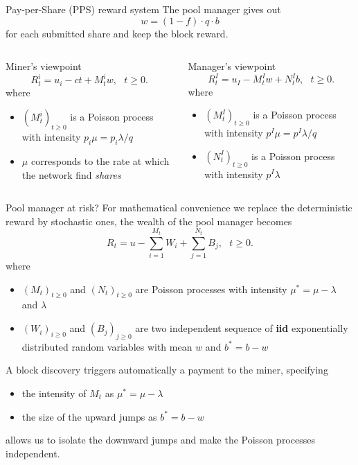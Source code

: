 \documentclass{beamer}
\makeatletter
\newcommand*{\iid}{\textbf{iid}\@\xspace}
\makeatother
\begin{document}
\begin{frame}{Pay-per-Share (PPS) reward system}
\scriptsize
The pool manager gives out
$$
w = (1-f)\cdot q \cdot b 
$$ 
for each submitted share and keep the block reward.
\vspace{1cm}
\begin{columns}
\begin{column}{0.5\textwidth}
Miner's viewpoint
$$
R_t^i = u_i-ct + M_t^i w,\text{ }t\geq0.
$$
where 
\begin{itemize}
   \item $(M_t^i)_{t\geq0}$ is a Poisson process with intensity $p_i \mu= p_i\lambda / q$
   \item $\mu$ corresponds to the rate at which the network find \textit{shares}
\end{itemize}
\end{column}
\begin{column}{0.5\textwidth}
Manager's viewpoint
$$
R_t^I = u_I - M_t^I w+N_t^I b,\text{ }t\geq0.
$$
where 
\begin{itemize}
   \item $(M_t^I)_{t\geq0}$ is a Poisson process with intensity $p^I\mu =p^I\lambda / q$
   \item $(N_t^I)_{t\geq0}$ is a Poisson process with intensity $p^I\lambda$
\end{itemize}
\end{column}
\end{columns}
\end{frame}
\begin{frame}{Pool manager at risk?}
\scriptsize
For mathematical convenience we replace the deterministic reward by stochastic ones, the wealth of the pool manager becomes
$$
R_t= u - \sum_{i=1}^{M_t} W_i +\sum_{j=1}^{N_t} B_j,\text{ }t\geq0.
$$
where 
\begin{itemize}
  \item $(M_t)_{t\geq0}$ and $(N_t)_{t\geq0}$ are Poisson processes with intensity $\mu^\ast=\mu- \lambda$ and $\lambda$
  \item $(W_i)_{i\geq0}$ and $(B_j)_{j\geq0}$ are two independent sequence of \iid exponentially distributed random variables with mean $w$ and $b^\ast = b-w$
\end{itemize}
\begin{tcolorbox}[enhanced,drop shadow, title=Poisson process superposition]
A block discovery triggers automatically a payment to the miner, specifying 
\begin{itemize}
\item the intensity of $M_t$ as $\mu^\ast=\mu- \lambda$ 
\item the size of the upward jumps as $b^\ast = b-w$ 
\end{itemize}
allows us to isolate the downward jumps and make the Poisson processes independent. 
\end{tcolorbox}
\end{frame}
\end{document}
